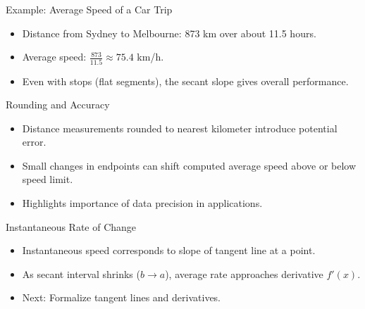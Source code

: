 \documentclass{beamer}
\begin{document}
\begin{frame}{Example: Average Speed of a Car Trip}
  \begin{itemize}
    \item Distance from Sydney to Melbourne: 873 km over about 11.5 hours.
    \item Average speed: $\frac{873}{11.5}\approx75.4$ km/h.
    \item Even with stops (flat segments), the secant slope gives overall performance.
  \end{itemize}
\end{frame}

\begin{frame}{Rounding and Accuracy}
  \begin{itemize}
    \item Distance measurements rounded to nearest kilometer introduce potential error.
    \item Small changes in endpoints can shift computed average speed above or below speed limit.
    \item Highlights importance of data precision in applications.
  \end{itemize}
\end{frame}

\begin{frame}{Instantaneous Rate of Change}
  \begin{itemize}
    \item Instantaneous speed corresponds to slope of tangent line at a point.
    \item As secant interval shrinks ($b\to a$), average rate approaches derivative $f'(x)$.
    \item Next: Formalize tangent lines and derivatives.
  \end{itemize}
\end{frame}
\end{document}
